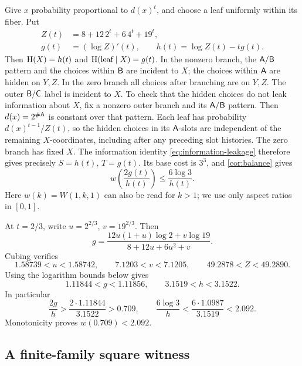 Give \(x\) probability proportional to \(d(x)^t\), and choose a leaf
uniformly within its fiber.
Put
\begin{equation}\label{eq:curve-functions}
 \begin{split}
 Z(t)&=8+12\,2^t+6\,4^t+19^t,\\
 g(t)&=(\log Z)'(t),\qquad h(t)=\log Z(t)-tg(t).
 \end{split}
\end{equation}
Then \(\mathrm H(X)=h(t)\) and \(\mathrm H(\text{leaf}\mid X)=g(t)\).
In the nonzero branch, the \(\mathsf A/\mathsf B\) pattern and the choices
within \(\mathsf B\) are incident to \(X\); the choices within \(\mathsf A\)
are hidden on \(Y,Z\).
In the zero branch all choices after branching are on \(Y,Z\).
The outer \(\mathsf B/\mathsf C\) label is incident to \(X\).
To check that the hidden choices do not leak information about \(X\),
fix a nonzero outer branch and its \(\mathsf A/\mathsf B\) pattern.
Then \(d(x)=2^{\#\mathsf A}\) is constant over that pattern.
Each leaf has probability \(d(x)^{t-1}/Z(t)\), so the hidden choices
in its \(\mathsf A\)-slots are independent of the remaining
\(X\)-coordinates, including after any preceding slot histories.
The zero branch has fixed \(X\).  The information identity
\eqref{eq:information-leakage} therefore gives precisely
\(S=h(t)\), \(T=g(t)\).
Its base cost is \(3^3\), and \cref{cor:balance} gives
\begin{equation}\label{eq:curve-bound}
 w\!\left(\frac{2g(t)}{h(t)}\right)
       \le\frac{6\log3}{h(t)} .
\end{equation}
Here \(w(k)=W(1,k,1)\) can also be read for \(k>1\);
we use only aspect ratios in \([0,1]\).

At \(t=2/3\), write \(u=2^{2/3}\), \(v=19^{2/3}\).
Then
\[
 g=\frac{12u(1+u)\log2+v\log19}{8+12u+6u^2+v}.
\]
Cubing verifies
\[
 1.58739<u<1.58742,\qquad
 7.1203<v<7.1205,\qquad
 49.2878<Z<49.2890.
\]
Using the logarithm bounds below gives
\[
 1.11844<g<1.11856,\qquad 3.1519<h<3.1522.
\]
In particular
\[
 \frac{2g}{h}>
 \frac{2\cdot1.11844}{3.1522}>0.709,\qquad
 \frac{6\log3}{h}<
 \frac{6\cdot1.0987}{3.1519}<2.092 .
\]
Monotonicity proves \(w(0.709)<2.092\).

\subsection{A finite-family square witness}\label{subsec:square}

